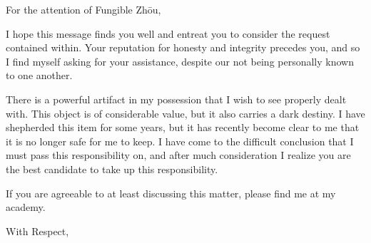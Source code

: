 \documentclass[13pt]{letter}
\date{}
\begin{document}
\begin{letter}{}
\address{Two Thunders Academy\\Red Jade Center}
\signature{
\LARGE
\textsl{Lei Si}
}

\opening{For the attention of Fungible Zhōu,}

I hope this message finds you well and entreat you to consider the request contained within.
Your reputation for honesty and integrity precedes you, and so I find myself asking for your
assistance, despite our not being personally known to one another.

There is a powerful artifact in my possession that I wish to see properly dealt with. This
object is of considerable value, but it also carries a dark destiny. I have shepherded this
item for some years, but it has recently become clear to me that it is no longer safe for me
to keep. I have come to the difficult conclusion that I must pass this responsibility on, and
after much consideration I realize you are the best candidate to take up this responsibility.

If you are agreeable to at least discussing this matter, please find me at my academy.

\closing{With Respect,}

\end{letter}
\end{document}

